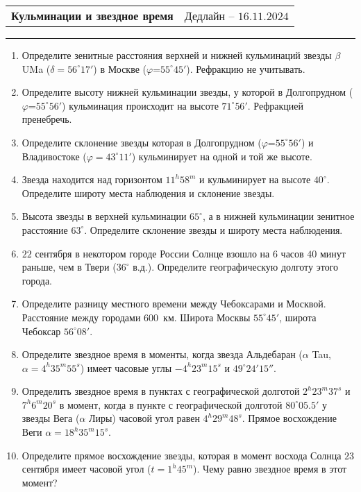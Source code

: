 \documentclass[12pt]{article}
\begin{document}
 \begin{tabularx}{\textwidth}{Xr}
  {\Large \textbf{Кульминации и звездное время}} & Дедлайн -- $16.11.2024$ \\
 \end{tabularx}
 \noindent\rule{\textwidth}{0.4pt}
 \begin{enumerate}
        \item Определите зенитные расстояния верхней и нижней кульминаций звезды $\beta$ UMa ($\delta=56^{\circ}17'$) в Москве ($\varphi$=$55^{\circ}45'$). Рефракцию не учитывать.
        \item Определите высоту нижней кульминации звезды, у которой в Долгопрудном ($\varphi$=$55^{\circ}56'$) кульминация происходит на высоте $71^{\circ}56'$. Рефракцией пренебречь. 
        \item Определите склонение звезды которая в Долгопрудном ($\varphi$=$55^{\circ}56'$) и Владивостоке ($\varphi=43^{\circ}11'$) кульминирует на одной и той же высоте.
        \item Звезда находится над горизонтом $11^h 58^m$ и кульминирует на высоте $40^{\circ}$. Определите широту места наблюдения и склонение звезды.
        \item Высота звезды в верхней кульминации $65^{\circ}$, а в нижней кульминации зенитное расстояние $63^{\circ}$. Определите склонение звезды и широту места наблюдения.
        \item $22$ сентября в некотором городе России Солнце взошло на $6$ часов $40$ минут раньше, чем в Твери ($36^{\circ}$ в.д.). Определите географическую долготу этого города.
        \item Определите разницу местного времени между Чебоксарами и Москвой. Расстояние между городами $600$~км. Широта Москвы $55^{\circ}45'$, широта Чебоксар $56^{\circ}08'$.
        \item Определите звездное время в моменты, когда звезда Альдебаран ($\alpha$ Tau, $\alpha=4^h 35^m 55^s$) имеет часовые углы $-4^h 23^m 15^s$ и $49^{\circ}24'15''$.
        \item Определить звездное время в пунктах с географической долготой $2^h 23^m 37^s$ и $7^h 6^m 20^s$ в момент, когда в пункте с географической долготой $80^{\circ} 05.5'$ у звезды Вега ($\alpha$ Лиры) часовой угол равен $4^h 29^m 48^s$. Прямое восхождение Веги $\alpha=18^h 35^m 15^s$. 
        \item Определите прямое восхождение звезды, которая в момент восхода Солнца $23$ сентября имеет часовой угол  ($t=1^h 45^m$). Чему равно звездное время в этот момент?
 \end{enumerate}
\end{document}
